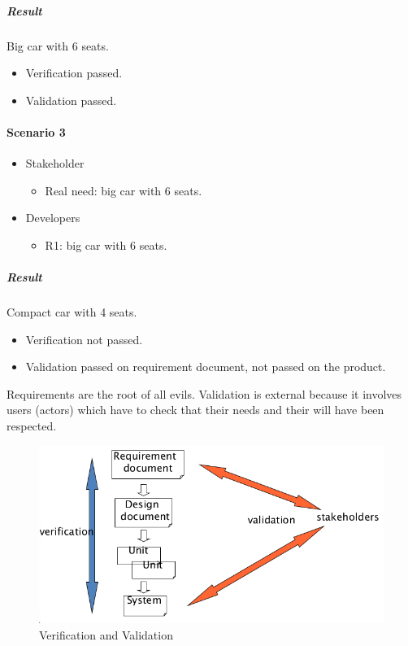 \subparagraph{Result}
Big car with 6 seats.
\begin{itemize}
\item Verification passed.
\item Validation passed.
\end{itemize}

\paragraph{Scenario 3}
\begin{itemize}
\item Stakeholder
\begin{itemize}
\item Real need: big car with 6 seats.
\end{itemize}
\item Developers
\begin{itemize}
\item R1: big car with 6 seats.
\end{itemize}
\end{itemize}

\subparagraph{Result}
Compact car with 4 seats.
\begin{itemize}
\item Verification not passed.
\item Validation passed on requirement document, not passed on the product.
\end{itemize}

Requirements are the root of all evils. Validation is external because it involves users (actors) which have to check that their needs and their will have been respected.

\begin{figure}[hbtp]
\centering
\includegraphics[scale=0.4]{images/v_v.png}
\caption{Verification and Validation}
\end{figure}

